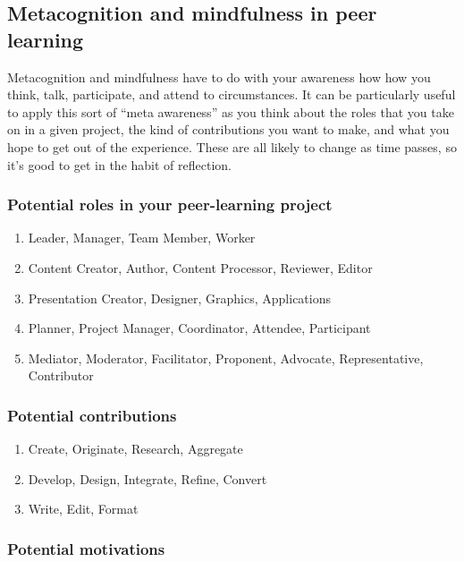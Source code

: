 \subsection{Metacognition and mindfulness in peer learning}

Metacognition and mindfulness have to do with your awareness how how you
think, talk, participate, and attend to circumstances. It can be
particularly useful to apply this sort of ``meta awareness'' as you
think about the roles that you take on in a given project, the kind of
contributions you want to make, and what you hope to get out of the
experience. These are all likely to change as time passes, so it's good
to get in the habit of reflection.

\subsubsection{Potential roles in your peer-learning project}

\begin{enumerate}
\item
  Leader, Manager, Team Member, Worker
\item
  Content Creator, Author, Content Processor, Reviewer, Editor
\item
  Presentation Creator, Designer, Graphics, Applications
\item
  Planner, Project Manager, Coordinator, Attendee, Participant
\item
  Mediator, Moderator, Facilitator, Proponent, Advocate, Representative,
  Contributor
\end{enumerate}
\subsubsection{Potential contributions}

\begin{enumerate}
\item
  Create, Originate, Research, Aggregate
\item
  Develop, Design, Integrate, Refine, Convert
\item
  Write, Edit, Format
\end{enumerate}
\subsubsection{Potential motivations}

